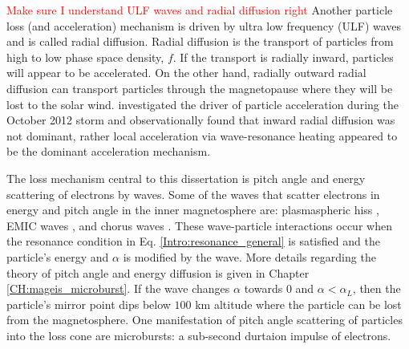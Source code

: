 \textcolor{red}{Make sure I understand ULF waves and radial diffusion right}
Another particle loss (and acceleration) mechanism is driven by ultra low frequency (ULF) waves and is called radial diffusion. Radial diffusion is the transport of particles from high to low phase space density, $f$. If the transport is radially inward, particles will appear to be accelerated. On the other hand, radially outward radial diffusion can transport particles through the magnetopause where they will be lost to the solar wind. \citet{Reeves2013} investigated the driver of particle acceleration during the October 2012 storm and observationally found that inward radial diffusion was not dominant, rather local acceleration via wave-resonance heating appeared to be the dominant acceleration mechanism.

The loss mechanism central to this dissertation is pitch angle and energy scattering of electrons by waves. Some of the waves that scatter electrons in energy and pitch angle in the inner magnetosphere are: plasmaspheric hiss \citep[e.g.][]{O'Brien2014, Breneman2015}, EMIC waves \citep[e.g.][]{Hendry2017, Capannolo2019energetic}, and chorus waves \citep[e.g.][]{Breneman2017, Kasahara2018, Ozaki2019}. These wave-particle interactions occur when the resonance condition in Eq. \ref{Intro:resonance_general} is satisfied and the particle's energy and $\alpha$ is modified by the wave. More details regarding the theory of pitch angle and energy diffusion is given in Chapter \ref{CH:mageis_microburst}. If the wave changes $\alpha$ towards $0$ and $\alpha < \alpha_{L}$, then the particle's mirror point dips below $100$ km altitude where the particle can be lost from the magnetosphere. One manifestation of pitch angle scattering of particles into the loss cone are microbursts: a sub-second durtaion impulse of electrons.

